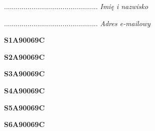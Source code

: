 \begin{turn}{90}\begin{minipage}{\linewidth} \vspace{20mm} ................................................  \textit{Imię i nazwisko}\end{minipage}\end{turn}

\begin{turn}{90}\begin{minipage}{\linewidth} \vspace{20mm} ................................................  \textit{Adres e-mailowy}\end{minipage}\end{turn}

\begin{turn}{90}\huge \begin{minipage}{\linewidth} \vspace{10mm}\textbf{S1A90069C}\end{minipage}\end{turn}

\begin{turn}{90}\huge \begin{minipage}{\linewidth} \vspace{10mm}\textbf{S2A90069C}\end{minipage}\end{turn}

\begin{turn}{90}\huge \begin{minipage}{\linewidth} \vspace{10mm}\textbf{S3A90069C}\end{minipage}\end{turn}

\begin{turn}{90}\huge \begin{minipage}{\linewidth} \vspace{10mm}\textbf{S4A90069C}\end{minipage}\end{turn}

\begin{turn}{90}\huge \begin{minipage}{\linewidth} \vspace{10mm}\textbf{S5A90069C}\end{minipage}\end{turn}

\begin{turn}{90}\huge \begin{minipage}{\linewidth} \vspace{10mm}\textbf{S6A90069C}\end{minipage}\end{turn}

